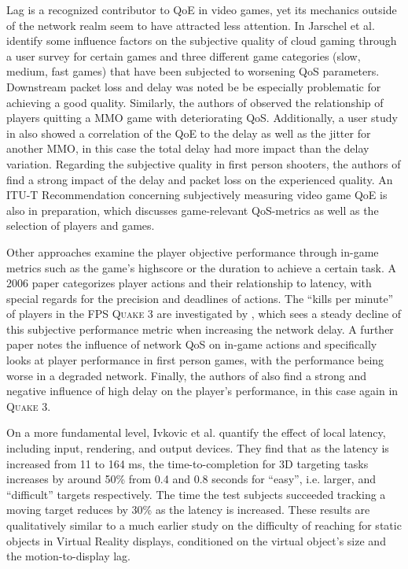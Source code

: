 Lag is a recognized contributor to \gls{QoE} in video games, yet its mechanics outside of the network realm seem to have attracted less attention.
In \cite{5976180} Jarschel et al. identify some influence factors on the subjective quality of cloud gaming through a user survey for certain games and three different game categories (slow, medium, fast games) that have been subjected to worsening \gls{QoS} parameters. Downstream packet loss and delay was noted be be especially problematic for achieving a good quality. Similarly, the authors of \cite{4591393} observed the relationship of players quitting a \gls{MMO} game with deteriorating \gls{QoS}. Additionally, a user study in \cite{4604397} also showed a correlation of the \gls{QoE} to the delay as well as the jitter for another \gls{MMO}, in this case the total delay had more impact than the delay variation. Regarding the subjective quality in first person shooters, the authors of \cite{6614351} find a strong impact of the delay and packet loss on the experienced quality. An ITU-T Recommendation \cite{mollertowards} concerning subjectively measuring video game \gls{QoE} is also in preparation, which discusses game-relevant \gls{QoS}-metrics as well as the selection of players and games.

Other approaches examine the player objective performance through in-game metrics such as the game's highscore or the duration to achieve a certain task. A 2006 paper \cite{Claypool:2006:LPA:1167838.1167860} categorizes player actions and their relationship to latency, with special regards for the precision and deadlines of actions. The ``kills per minute'' of players in the \gls{FPS} \textsc{Quake 3} are investigated by \cite{1266180}, which sees a steady decline of this subjective performance metric when increasing the network delay. A further paper \cite{claypool2007} notes the influence of network \gls{QoS} on in-game actions and specifically looks at player performance in first person games, with the performance being worse in a degraded network. Finally, the authors of \cite{Bredel:2010:MSR:1944796.1944797} also find a strong and negative influence of high delay on the player's performance, in this case again in \textsc{Quake 3}. 

On a more fundamental level, Ivkovic et al. \cite{Ivkovic:2015:QMN:2702123.2702432} quantify the effect of local latency, including input, rendering, and output devices. They find that as the latency is increased from 11 to 164 ms, the time-to-completion for 3D targeting tasks increases by around 50\% from 0.4 and 0.8 seconds for ``easy'', i.e. larger, and ``difficult'' targets respectively. The time the test subjects succeeded tracking a moving target reduces by 30\% as the latency is increased. These results are qualitatively similar to a much earlier study \cite{Ware:1994:ROV:198425.198426} on the difficulty of reaching for static objects in Virtual Reality displays, conditioned on the virtual object's size and the motion-to-display lag.


